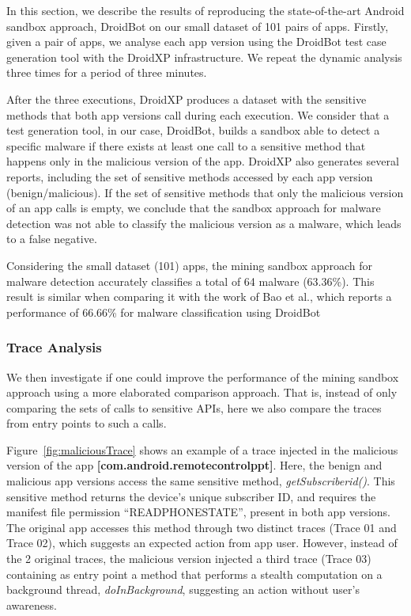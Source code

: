 
In this section, we describe the results of reproducing the state-of-the-art Android sandbox approach, DroidBot on our small dataset of \num{101} pairs of apps.
Firstly, given a pair of apps, we analyse each app version using the DroidBot test case generation tool with the DroidXP infrastructure. We repeat
the dynamic analysis three times for a period of three minutes.

After the three executions, DroidXP produces a dataset with the sensitive methods that both app versions call during each execution. We consider that a test
generation tool, in our case, DroidBot, builds a sandbox able to detect a specific malware if there exists at least one call to a sensitive method that happens
only in the malicious version of the app. DroidXP also generates several reports, including the set of sensitive methods accessed by each app version (benign/malicious).
If the set of sensitive methods that only the malicious version of an app calls is empty,
we conclude that the sandbox approach for malware detection was not able to classify the malicious version as a malware, which leads to a false negative.

Considering the small dataset (101) apps, the mining sandbox approach for malware detection accurately classifies a total of \num{64} malware (\num{63.36}\%).
This result is similar when comparing it with the work of Bao et al., which reports a performance
of \num{66.66}\% for malware classification using
DroidBot~\cite{DBLP:conf/wcre/BaoLL18}

\subsubsection{Trace Analysis}

We then investigate if one could improve the performance of
the mining sandbox approach using a more elaborated comparison approach.
That is, instead of only comparing the sets of calls to sensitive APIs,
here we also compare the traces from entry points to such a calls.

Figure~\ref{fig:maliciousTrace} shows an example of a trace injected in the malicious version of the app \textbf{[com.android.remotecontrolppt]}.
Here, the benign and malicious app versions access the same sensitive method, \textit{getSubscriberid()}. This sensitive method returns the device's unique
subscriber ID, and requires the manifest file permission ``READ\underline{\space}PHONE\underline{\space}STATE'', present in both app versions.
The original app accesses this method through two distinct traces (Trace 01 and Trace 02), which suggests an expected action from app user. However,
instead of the 2 original traces, the malicious version injected a third trace (Trace 03) containing as entry point a method that performs a stealth
computation on a background thread, \textit{doInBackground}, suggesting an action without user's awareness.


